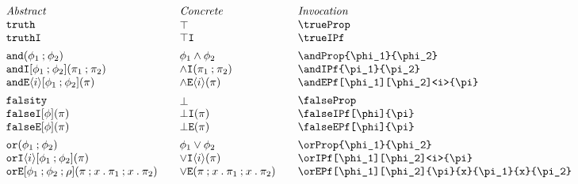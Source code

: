 \documentclass[11pt]{article}
\begin{document}
\begin{figure}

  \begin{small}
    \begin{displaymath}
      \begin{array}{l@{\qquad}l@{\qquad}l@{\qquad}l}
        \textit{Abstract} & \textit{Concrete} & \textit{Invocation} \\
        \trueProp                                       & \trueProp*                       & \verb|\trueProp|                                       \\
        \trueIPf                                        & \trueIPf*                        & \verb|\trueIPf|                                        \\[1ex]

        \andProp{\phi_1}{\phi_2}                        & \andProp*{\phi_1}{\phi_2}        & \verb|\andProp{\phi_1}{\phi_2}|                        \\
        \andIPf{\pi_1}{\pi_2}                           & \andIPf*{\pi_1}{\pi_2}           & \verb|\andIPf{\pi_1}{\pi_2}|                           \\
        \andEPf[\phi_1][\phi_2]<i>{\pi}                 & \andEPf*<i>{\pi}                 & \verb|\andEPf[\phi_1][\phi_2]<i>{\pi}|                 \\[1ex]

        \falseProp                                      & \falseProp*                      & \verb|\falseProp|                                      \\
        \falseIPf[\phi]{\pi}                            & \falseIPf*{\pi}                  & \verb|\falseIPf[\phi]{\pi}|                            \\
        \falseEPf[\phi]{\pi}                            & \falseEPf*{\pi}                  & \verb|\falseEPf[\phi]{\pi}|                            \\[1ex]

        \orProp{\phi_1}{\phi_2}                         & \orProp*{\phi_1}{\phi_2}         & \verb|\orProp{\phi_1}{\phi_2}|                         \\
        \orIPf[\phi_1][\phi_2]<i>{\pi}                  & \orIPf*<i>{\pi}                  & \verb|\orIPf[\phi_1][\phi_2]<i>{\pi}|                  \\
        \orEPf[\phi_1][\phi_2]{\pi}{x}{\pi_1}{x}{\pi_2} & \orEPf*{\pi}{x}{\pi_1}{x}{\pi_2} & \verb|\orEPf[\phi_1][\phi_2]{\pi}{x}{\pi_1}{x}{\pi_2}| \\[1ex]


\end{array}
\end{displaymath}
\end{small}
\end{figure}
\end{document}
